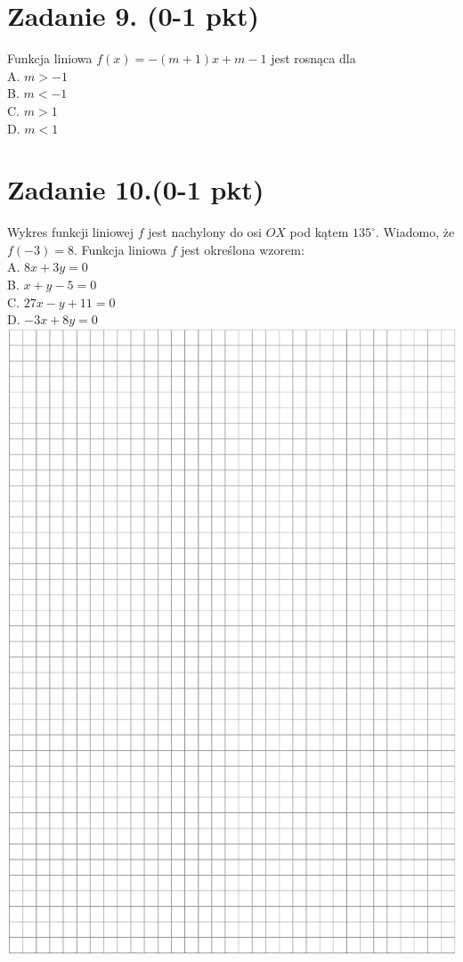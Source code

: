 \documentclass[10pt]{article}
\begin{document}
\section*{Zadanie 9. (0-1 pkt)}
Funkcja liniowa \(f(x)=-(m+1) x+m-1\) jest rosnąca dla\\
A. \(m>-1\)\\
B. \(m<-1\)\\
C. \(m>1\)\\
D. \(m<1\)

\section*{Zadanie 10.(0-1 pkt)}
Wykres funkcji liniowej \(f\) jest nachylony do osi \(O X\) pod kątem \(135^{\circ}\). Wiadomo, że \(f(-3)=8\). Funkcja liniowa \(f\) jest określona wzorem:\\
A. \(8 x+3 y=0\)\\
B. \(x+y-5=0\)\\
C. \(27 x-y+11=0\)\\
D. \(-3 x+8 y=0\)\\
\includegraphics[max width=\textwidth, center]{2024_11_21_997c30e0b98e62837d84g-05}
\end{document}
